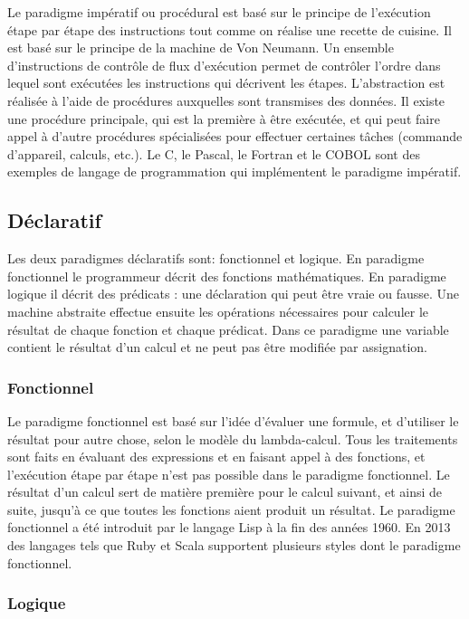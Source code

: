 \documentclass[a4paper,12pt]{article}
\begin{document}
Le paradigme impératif ou procédural est basé sur le principe de l'exécution étape par étape des instructions tout comme on réalise une recette de cuisine. Il est basé sur le principe de la machine de Von Neumann. Un ensemble d'instructions de contrôle de flux d'exécution permet de contrôler l'ordre dans lequel sont exécutées les instructions qui décrivent les étapes. L'abstraction est réalisée à l'aide de procédures auxquelles sont transmises des données. Il existe une procédure principale, qui est la première à être exécutée, et qui peut faire appel à d'autre procédures spécialisées pour effectuer certaines tâches (commande d'appareil, calculs, etc.). Le C, le Pascal, le Fortran et le COBOL sont des exemples de langage de programmation qui implémentent le paradigme impératif\cite{jana}.

\subsection{Déclaratif}

Les deux paradigmes déclaratifs sont: fonctionnel et logique. En paradigme fonctionnel le programmeur décrit des fonctions mathématiques. En paradigme logique il décrit des prédicats : une déclaration qui peut être vraie ou fausse\cite{kumar}. Une machine abstraite effectue ensuite les opérations nécessaires pour calculer le résultat de chaque fonction et chaque prédicat. Dans ce paradigme une variable contient le résultat d'un calcul et ne peut pas être modifiée par assignation\cite{kumar}.

\subsubsection{Fonctionnel}

Le paradigme fonctionnel est basé sur l'idée d'évaluer une formule, et d'utiliser le résultat pour autre chose, selon le modèle du lambda-calcul. Tous les traitements sont faits en évaluant des expressions et en faisant appel à des fonctions, et l'exécution étape par étape n'est pas possible dans le paradigme fonctionnel. Le résultat d'un calcul sert de matière première pour le calcul suivant, et ainsi de suite, jusqu'à ce que toutes les fonctions aient produit un résultat\cite{jana}. Le paradigme fonctionnel a été introduit par le langage Lisp à la fin des années 1960. En 2013 des langages tels que Ruby et Scala supportent plusieurs styles dont le paradigme fonctionnel\cite{kumar}.

\subsubsection{Logique}
\end{document}
